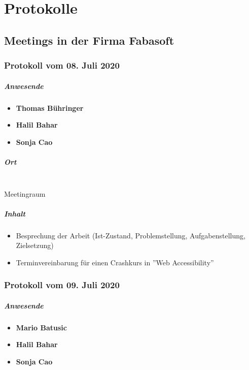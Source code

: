 \chapter{Protokolle}
\section{Meetings in der Firma Fabasoft}
\subsection{Protokoll vom 08. Juli 2020}
\paragraph{Anwesende}
\begin{itemize}
	\item{\textbf{Thomas Bühringer}}
	\item{\textbf{Halil Bahar}}
	\item{\textbf{Sonja Cao}}
\end{itemize}

\paragraph{Ort}\mbox{}\\
Meetingraum

\paragraph{Inhalt}
\begin{itemize}
	\item Besprechung der Arbeit (Ist-Zustand, Problemstellung, Aufgabenstellung, Zielsetzung)
	\item Terminvereinbarung für einen Crashkurs in ''Web Accessibility''
\end{itemize}

\subsection{Protokoll vom 09. Juli 2020}
\paragraph{Anwesende}
\begin{itemize}
	\item{\textbf{Mario Batusic}}
	\item{\textbf{Halil Bahar}}
	\item{\textbf{Sonja Cao}}
\end{itemize}

